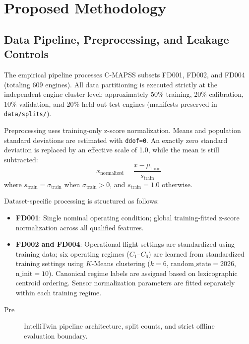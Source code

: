\section{Proposed Methodology}
\label{sec:methodology}

\subsection{Data Pipeline, Preprocessing, and Leakage Controls}
The empirical pipeline processes C-MAPSS subsets FD001, FD002, and FD004 (totaling 609 engines). All data partitioning is executed strictly at the independent engine cluster level: approximately 50\% training, 20\% calibration, 10\% validation, and 20\% held-out test engines (manifests preserved in \texttt{data/splits/}).

Preprocessing uses training-only z-score normalization. Means and population standard deviations are estimated with \texttt{ddof=0}. An exactly zero standard deviation is replaced by an effective scale of 1.0, while the mean is still subtracted:
\begin{equation}
x_{\text{normalized}} = \frac{x - \mu_{\text{train}}}{s_{\text{train}}}
\end{equation}
where $s_{\text{train}} = \sigma_{\text{train}}$ when $\sigma_{\text{train}} > 0$, and $s_{\text{train}} = 1.0$ otherwise.

Dataset-specific processing is structured as follows:
\begin{itemize}
  \item \textbf{FD001}: Single nominal operating condition; global training-fitted z-score normalization across all qualified features.
  \item \textbf{FD002 and FD004}: Operational flight settings are standardized using training data; six operating regimes ($C_1$--$C_6$) are learned from standardized training settings using $K$-Means clustering ($k=6$, $\text{random\_state}=2026$, $\text{n\_init}=10$). Canonical regime labels are assigned based on lexicographic centroid ordering. Sensor normalization parameters are fitted separately within each training regime.
\end{itemize}
Pre\begin{figure}[htbp]
\centering
\resizebox{\columnwidth}{!}{}
\caption{IntelliTwin pipeline architecture, split counts, and strict offline evaluation boundary.}
\label{fig:architecture}
\end{figure}

